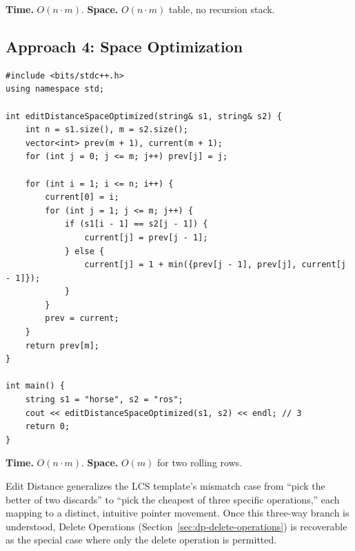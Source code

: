 \begin{complexitybox}
\textbf{Time.} $O(n \cdot m)$.
\textbf{Space.} $O(n \cdot m)$ table, no recursion stack.
\end{complexitybox}

\subsection*{Approach 4: Space Optimization}

\begin{lstlisting}
#include <bits/stdc++.h>
using namespace std;

int editDistanceSpaceOptimized(string& s1, string& s2) {
    int n = s1.size(), m = s2.size();
    vector<int> prev(m + 1), current(m + 1);
    for (int j = 0; j <= m; j++) prev[j] = j;

    for (int i = 1; i <= n; i++) {
        current[0] = i;
        for (int j = 1; j <= m; j++) {
            if (s1[i - 1] == s2[j - 1]) {
                current[j] = prev[j - 1];
            } else {
                current[j] = 1 + min({prev[j - 1], prev[j], current[j - 1]});
            }
        }
        prev = current;
    }
    return prev[m];
}

int main() {
    string s1 = "horse", s2 = "ros";
    cout << editDistanceSpaceOptimized(s1, s2) << endl; // 3
    return 0;
}
\end{lstlisting}

\begin{complexitybox}
\textbf{Time.} $O(n \cdot m)$.
\textbf{Space.} $O(m)$ for two rolling rows.
\end{complexitybox}

\begin{takeawaybox}
Edit Distance generalizes the LCS template's mismatch case from ``pick
the better of two discards'' to ``pick the cheapest of three specific
operations,'' each mapping to a distinct, intuitive pointer movement.
Once this three-way branch is understood, Delete Operations
(Section~\ref{sec:dp-delete-operations}) is recoverable as the special
case where only the delete operation is permitted.
\end{takeawaybox}
